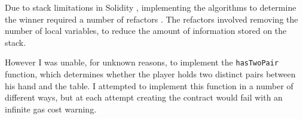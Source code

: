 Due to stack limitations in Solidity \cite{stack}, implementing the algorithms to determine the winner required a number of refactors \cite{stackrefactor}. The refactors involved removing the number of local variables, to reduce the amount of information stored on the stack.

However I was unable, for unknown reasons, to implement the \texttt{hasTwoPair} function, which determines whether the player holds two distinct pairs between his hand and the table. I attempted to implement this function in a number of different ways, but at each attempt creating the contract would fail with an infinite gas cost warning.

%
